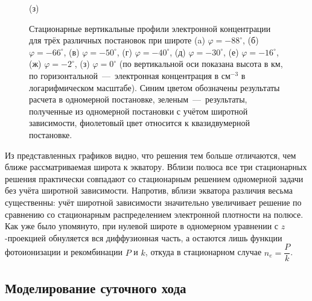 \documentclass[14pt, a4paper, fleqn]{extarticle}
\begin{document}
\begin{figure}[H]

(з)
\caption{Стационарные вертикальные профили электронной концентрации для трёх различных постановок при широте (a) $\varphi = -88^\circ$, (б) $\varphi = -66^\circ$, (в) $\varphi = -50^\circ$, (г) $\varphi = -40^\circ$, (д) $\varphi = -30^\circ$, (е) $\varphi = -16^\circ$, (ж) $\varphi = -2^\circ$, (з) $\varphi = 0^\circ$ (по вертикальной оси показана высота в км, по горизонтальной~---~электронная концентрация в см$^{-3}$ в логарифмическом масштабе). Синим цветом обозначены результаты расчета в одномерной постановке, зеленым~---~результаты, полученные из одномерной постановки с учётом широтной зависимости, фиолетовый цвет относится к квазидвумерной постановке.}
\end{figure}
Из представленных графиков видно, что решения тем больше отличаются, чем ближе рассматриваемая широта к экватору. Вблизи полюса все три стационарных решения практически совпадают со стационарным решением одномерной задачи без учёта широтной зависимости. Напротив, вблизи экватора различия весьма существенны: учёт широтной зависимости значительно увеличивает решение по сравнению со стационарным распределением электронной плотности на полюсе. Как уже было упомянуто, при нулевой широте в одномерном уравнении с $z$-проекцией обнуляется вся диффузионная часть, а остаются лишь функции фотоионизации и рекомбинации $P$ и $k$, откуда в стационарном случае $n_e = \dfrac{P}{k}$.




\subsection{Моделирование суточного хода}
\end{document}
